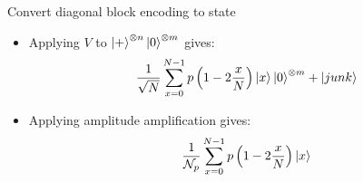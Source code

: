 \documentclass{beamer}
\begin{document}
    \begin{frame}{Convert diagonal block encoding to state}
\begin{itemize}
    \item Applying $V$ to $\ket{+}^{\otimes n}\ket{0}^{\otimes m}$ gives:
    \begin{equation*}
       \frac{1}{ \sqrt{N}}\sum_{x=0}^{N-1} p\left(1-2\frac{x}{N}\right) \ket{x}\ket{0}^{\otimes m} + \ket{junk}
    \end{equation*}
    \item Applying amplitude amplification gives:
    \begin{equation*}
       \frac{1}{ \mathcal{N}_p}\sum_{x=0}^{N-1} p\left(1-2\frac{x}{N}\right) \ket{x}
    \end{equation*}

\end{itemize}
\end{frame}
\end{document}
